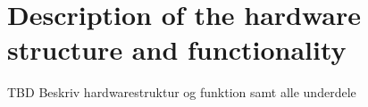 \section{Description of the hardware structure and functionality}
TBD Beskriv hardwarestruktur og funktion samt alle underdele

